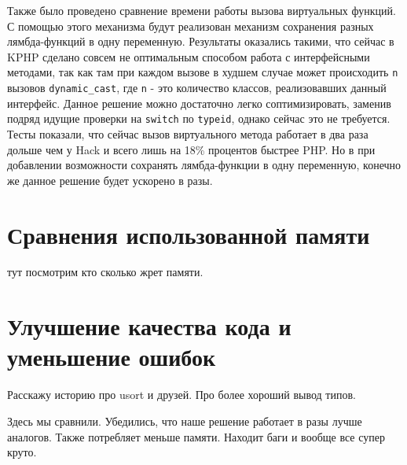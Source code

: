Также было проведено сравнение времени работы вызова виртуальных функций.
С помощью этого механизма будут реализован механизм сохранения разных лямбда-функций в одну переменную.
Результаты оказались такими, что сейчас в KPHP сделано совсем не оптимальным способом работа с интерфейсными методами, так как там при каждом вызове в худшем случае может происходить \verb|n| вызовов \verb|dynamic_cast|, где \verb|n| - это количество классов, реализовавших данный интерфейс.
Данное решение можно достаточно легко соптимизировать, заменив подряд идущие проверки на \verb|switch| по \verb|typeid|\cite{fast-dynamic-cast}, однако сейчас это не требуется.
Тесты показали, что сейчас вызов виртуального метода работает в два раза дольше чем у Hack и всего лишь на 18\% процентов быстрее PHP.
Но в при добавлении возможности сохранять лямбда-функции в одну переменную, конечно же данное решение будет ускорено в разы.


\section{Сравнения использованной памяти}
тут посмотрим кто сколько жрет памяти.

\section{Улучшение качества кода и уменьшение ошибок}
Расскажу историю про usort и друзей.
Про более хороший вывод типов.

\chapterconclusion
Здесь мы сравнили.
Убедились, что наше решение работает в разы лучше аналогов.
Также потребляет меньше памяти.
Находит баги и вообще все супер круто.
